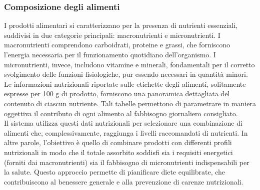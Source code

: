 \documentclass[11pt,a4paper]{article}
\begin{document}
\subsubsection{Composizione degli alimenti}
I prodotti alimentari si caratterizzano per la presenza di nutrienti essenziali, suddivisi in due categorie principali: macronutrienti e micronutrienti. I macronutrienti comprendono carboidrati, proteine e grassi, che forniscono l'energia necessaria per il funzionamento quotidiano dell'organismo. I micronutrienti, invece, includono vitamine e minerali, fondamentali per il corretto svolgimento delle funzioni fisiologiche, pur essendo necessari in quantità minori.\\[0.5em]
Le informazioni nutrizionali riportate sulle etichette degli alimenti, solitamente espresse per 100 g di prodotto, forniscono una panoramica dettagliata del contenuto di ciascun nutriente. Tali tabelle permettono di parametrare in maniera oggettiva il contributo di ogni alimento al fabbisogno giornaliero consigliato.\\[0.5em]
Il sistema utilizza questi dati nutrizionali per selezionare una combinazione di alimenti che, complessivamente, raggiunga i livelli raccomandati di nutrienti. In altre parole, l'obiettivo è quello di combinare prodotti con differenti profili nutrizionali in modo che il totale assorbito soddisfi sia i requisiti energetici (forniti dai macronutrienti) sia il fabbisogno di micronutrienti indispensabili per la salute. Questo approccio permette di pianificare diete equilibrate, che contribuiscono al benessere generale e alla prevenzione di carenze nutrizionali.
\end{document}
